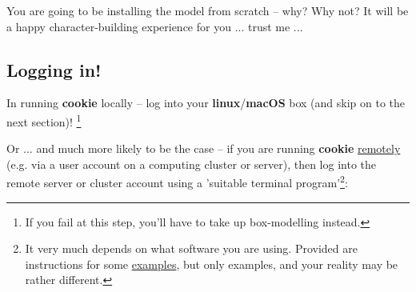 You are going to be installing the model from scratch – why? Why not? It will be a happy character-building experience for you ... trust me ...


\subsection{Logging in!}

In running \textbf{cookie} locally -- log into your \textbf{linux}/\textbf{macOS} box (and skip on to the next section)! \footnote{If you fail at this step, you'll have to take up box-modelling instead.}

\noindent Or ... and much more likely to be the case -- if you are running \textbf{cookie} \uline{remotely} (e.g. via a user account on a computing cluster or server), then log into the remote server or cluster account using a 'suitable terminal program'\footnote{It very much depends on what software you are using. Provided are instructions for some \uline{examples}, but only examples, and your reality may be rather different.}:

